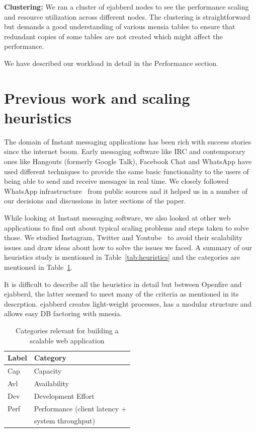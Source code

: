 \documentclass[a4paper, twocolumn]{article}
\begin{document}
\textbf{Clustering: }
We ran a cluster of ejabberd nodes to see the performance scaling and resource utilization across different nodes. The clustering is straightforward but demands a good understanding of various mensia tables to ensure that redundant copies of some tables are not created which might affect the performance. 

We have described our workload in detail in the Performance section. 

\section{Previous work and scaling heuristics}

The domain of Instant messaging applications has been rich with success stories since the internet boom. Early messaging software like IRC and contemporary ones like Hangouts (formerly Google Talk), Facebook Chat and WhatsApp have used different techniques to provide the same basic functionality to the users of being able to send and receive messages in real time. We closely followed WhatsApp infrastructure~\cite{w4} from public sources and it helped us in a number of our decisions and discussions in later sections of the paper. 

While looking at Instant messaging software, we also looked at other web applications to find out about typical scaling problems and steps taken to solve those. We studied Instagram, Twitter and Youtube~\cite{instagram_ppt,youtube,twitter} to avoid their scalability issues and draw ideas about how to solve the issues we faced. A summary of our heuristics study is mentioned in Table~\ref{tab:heuristics} and the categories are mentioned in Table~\ref{tab:categories}. 

It is difficult to describe all the heuristics in detail but between Openfire and ejabberd, the latter seemed to meet many of the criteria as mentioned in its descrption. ejabberd creates light-weight processes, has a modular structure and allows easy DB factoring with mnesia. 

\begin{table}
\centering
\begin{tabular}{|l|l|}
\hline
\bf{Label} & \bf{Category} \\
\hline
Cap & Capacity \\
Avl & Availability \\
Dev & Development Effort \\
Perf & Performance (client latency + \\
& system throughput)\\
\hline
\end{tabular}
\caption{\label{tab:categories}Categories relevant for building a scalable web application}
\end{table}
\end{document}
